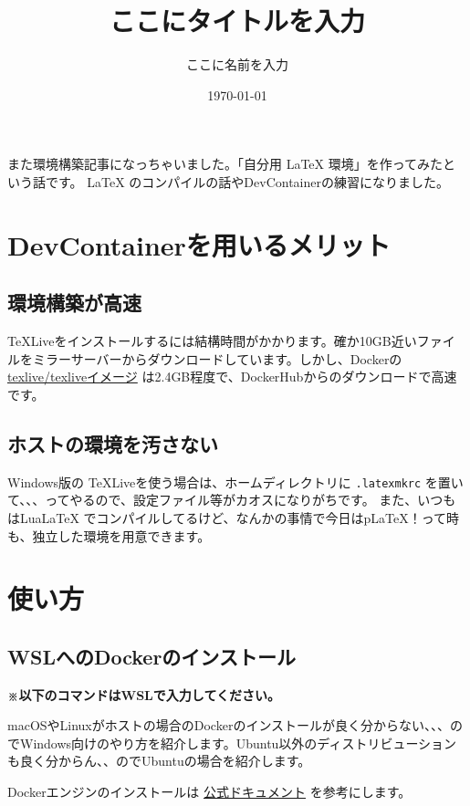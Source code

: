\documentclass[lualatex,paper=a4paper]{jlreq}
\title{ここにタイトルを入力}
\author{ここに名前を入力}
\date{\today}
\begin{document}
\maketitle

また環境構築記事になっちゃいました。「自分用 \LaTeX{} 環境」を作ってみたという話です。 \LaTeX{} のコンパイルの話やDevContainerの練習になりました。

\section{DevContainerを用いるメリット}

\subsection{環境構築が高速}
\TeX Liveをインストールするには結構時間がかかります。確か10GB近いファイルをミラーサーバーからダウンロードしています。しかし、Dockerの \href{https://hub.docker.com/r/texlive/texlive}{texlive/texliveイメージ} は2.4GB程度で、DockerHubからのダウンロードで高速です。

\subsection{ホストの環境を汚さない}
Windows版の \TeX Liveを使う場合は、ホームディレクトリに \texttt{.latexmkrc} を置いて、、、ってやるので、設定ファイル等がカオスになりがちです。
また、いつもはLua\LaTeX{} でコンパイルしてるけど、なんかの事情で今日はp\LaTeX{}！って時も、独立した環境を用意できます。

\section{使い方}

\subsection{WSLへのDockerのインストール}
\textbf{※以下のコマンドはWSLで入力してください。}

macOSやLinuxがホストの場合のDockerのインストールが良く分からない、、、のでWindows向けのやり方を紹介します。Ubuntu以外のディストリビューションも良く分からん、、のでUbuntuの場合を紹介します。

Dockerエンジンのインストールは \href{https://docs.docker.com/engine/install/ubuntu/}{公式ドキュメント} を参考にします。
\end{document}

